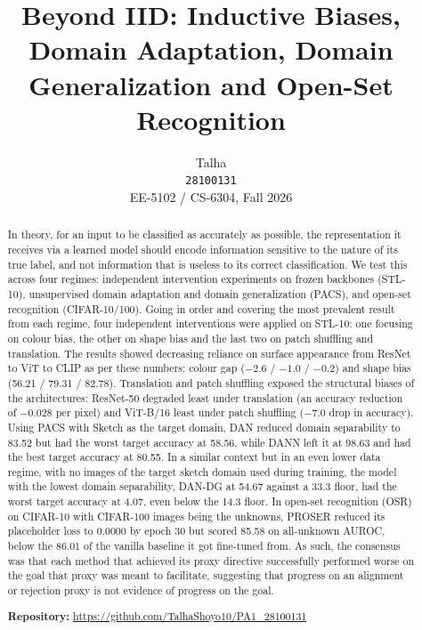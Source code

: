 \documentclass{article}
\title{Beyond IID: Inductive Biases, Domain Adaptation, Domain Generalization and Open-Set Recognition}
\author{%
  Talha \\
  \texttt{28100131} \\
  EE-5102 / CS-6304, Fall 2026 \\
}
\begin{document}
\maketitle

\begin{abstract}
In theory, for an input to be classified as accurately as possible, the
representation it receives via a learned model should encode information
sensitive to the nature of its true label, and not information that is
useless to its correct classification. We test this across four regimes:
independent intervention experiments on frozen backbones (STL-10),
unsupervised domain adaptation and domain generalization (PACS), and
open-set recognition (CIFAR-10/100). Going in order and covering the most
prevalent result from each regime, four independent interventions were
applied on STL-10: one focusing on colour bias, the other on shape bias and
the last two on patch shuffling and translation. The results showed
decreasing reliance on surface appearance from ResNet to ViT to CLIP as per
these numbers: colour gap ($-2.6$ / $-1.0$ / $-0.2$) and shape bias
(56.21 / 79.31 / 82.78). Translation and patch shuffling exposed the
structural biases of the architectures: ResNet-50 degraded least under
translation (an accuracy reduction of $-0.028$ per pixel) and ViT-B/16 least
under patch shuffling ($-7.0$ drop in accuracy). Using PACS with Sketch as
the target domain, DAN reduced domain separability to 83.52 but had the worst
target accuracy at 58.56, while DANN left it at 98.63 and had the best target
accuracy at 80.55. In a similar context but in an even lower data regime,
with no images of the target sketch domain used during training, the model
with the lowest domain separability, DAN-DG at 54.67 against a 33.3 floor,
had the worst target accuracy at 4.07, even below the 14.3 floor. In open-set
recognition (OSR) on CIFAR-10 with CIFAR-100 images being the unknowns,
PROSER reduced its placeholder loss to 0.0000 by epoch 30 but scored 85.58 on
all-unknown AUROC, below the 86.01 of the vanilla baseline it got fine-tuned
from. As such, the consensus was that each method that achieved its proxy
directive successfully performed worse on the goal that proxy was meant to
facilitate, suggesting that progress on an alignment or rejection proxy is
not evidence of progress on the goal.

\textbf{Repository:} \url{https://github.com/TalhaShoyo10/PA1_28100131}
\end{abstract}
\end{document}

